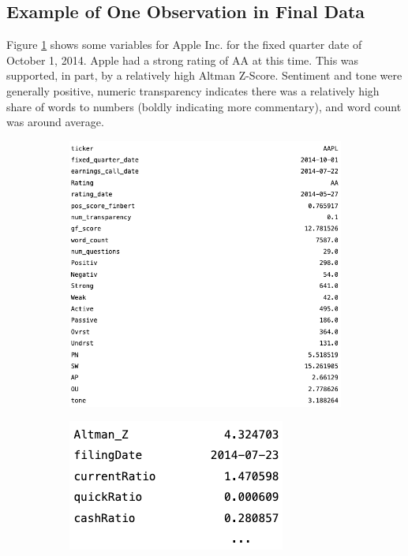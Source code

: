 \documentclass{article}[11pt]
\begin{document}
    \subsection{Example of One Observation in Final Data}

    \label{sec:one-obs-final-data}

    Figure \ref{fig:one-obs-final-data} shows some variables for Apple Inc. for the fixed quarter date of October 1, 2014. Apple had a strong rating of AA at this time. This was supported, in part, by a relatively high Altman Z-Score. Sentiment and tone were generally positive, numeric transparency indicates there was a relatively high share of words to numbers (boldly indicating more commentary), and word count was around average.

    \begin{figure}[h]
        \caption{Apple Inc., October 1, 2014}
        \begin{subfigure}[h]{0.4925\textwidth}
            \centering
            \includegraphics[width=0.95\hsize]{../Output/NLP/aapl nlp.png}
        \end{subfigure}
        \begin{subfigure}[h]{0.4925\textwidth}
            \centering
            \includegraphics[width=0.5\hsize]{../Output/NLP/aapl fin.png}
        \end{subfigure}
        \hfill
        \label{fig:one-obs-final-data}
    \end{figure}
\end{document}
